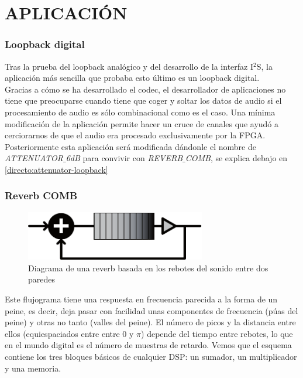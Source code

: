 \part{APLICACIÓN}

\section{Loopback digital}
	Tras la prueba del loopback analógico y del desarrollo de la interfaz I$^2$S, la  aplicación más sencilla que probaba esto último es un loopback digital.\\

	Gracias a cómo se ha desarrollado el codec, el desarrollador de aplicaciones no tiene que preocuparse cuando tiene que coger y soltar los datos de audio si el procesamiento de audio es sólo combinacional como es el caso.
	Una mínima modificación de la aplicación permite hacer un cruce de canales que ayudó a cerciorarnos de que el audio era procesado exclusivamente por la FPGA. Posteriormente esta aplicación será modificada dándonle el nombre de \emph{ATTENUATOR$\_$6dB} para convivir con \emph{REVERB$\_$COMB}, se explica debajo en \ref{directo:attenuator-loopback}

\section{Reverb COMB}
\begin{figure}[h]
\begin{center}
	\includegraphics[width=0.7\textwidth]{./reverb_simple_diagram-eps-converted-to}
\caption{Diagrama de una reverb basada en los rebotes del sonido entre dos paredes}
\end{center}
\end{figure}
	Este flujograma tiene una respuesta en frecuencia parecida a la forma de un peine, es decir, deja pasar con facilidad unas componentes de frecuencia (púas del peine) y otras no tanto (valles del peine). El número de picos y la distancia entre ellos (equiespaciados entre entre 0 y $\pi$) depende del tiempo entre rebotes, lo que en el mundo digital es el número de muestras de retardo. Vemos que el esquema contiene los tres bloques básicos de cualquier DSP: un sumador, un multiplicador y una memoria.
	
